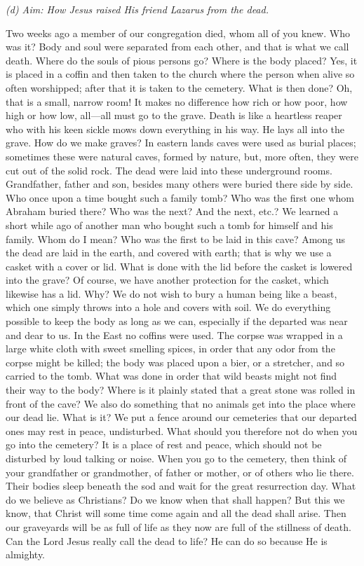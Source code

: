 \emph{(d) Aim: How Jesus raised His friend Lazarus from the dead.}

Two weeks ago a member of our congregation died, whom all of you knew. Who was it? Body and soul were separated from each other, and that is what we call death. Where do the souls of pious
persons go? Where is the body placed? Yes, it is placed in a coffin and then taken to the church where the person when alive so often worshipped; after that it is taken to the cemetery. What is then done? Oh, that is a small, narrow room! It makes no difference how rich or how poor, how high or how low, all—all must go to the grave. Death is like a heartless reaper who with his keen sickle mows down everything in his way. He lays all into the grave. How do we make graves? In eastern lands caves were used as burial places; sometimes these were natural caves, formed by nature, but, more often, they were cut out of the solid rock. The dead were laid into these underground rooms. Grandfather, father and son, besides many others were buried there side by side. Who once upon a time bought such a family tomb? Who was the first one whom Abraham buried there? Who was the next? And the next, etc.? We learned a short while ago of another man who bought such a tomb for himself and his family. Whom do I mean? Who was the first to be laid in this cave? Among us the dead are laid in the earth, and covered with earth; that is why we use a casket with a cover or lid. What is done with the lid before the casket is lowered into the grave? Of course, we have another protection for the casket, which likewise has a lid. Why? We do not wish to bury a human being like a beast, which one simply throws into a hole and covers with soil. We do everything possible to keep the body as long as we can, especially if the departed was near and dear to us. In the East no coffins were used. The corpse was wrapped in a large white cloth with sweet smelling spices, in order that any odor from the corpse might be killed; the body was placed upon a bier, or a stretcher, and so carried to the tomb. What was done in order that wild beasts might not find their way to the body? Where is it plainly stated that a great stone was rolled in front of the cave? We also do something that no animals get into the place where our dead lie. What is it? We put a fence around our cemeteries that our departed ones may rest in peace, undisturbed. What should you therefore not do when you go into the cemetery? It is a place of rest and peace, which should not be disturbed by loud talking or noise. When you go to the cemetery, then think of your grandfather or grandmother, of father or mother, or of others who lie there. Their bodies sleep beneath the sod and wait for the great resurrection day. What do we believe as Christians? Do we know when that shall happen? But this we know, that Christ will some time come again and all the dead shall arise. Then our graveyards will be as full of life as they now are full of the stillness of death. Can the Lord Jesus really call the dead to life? He can do so because He is almighty.

